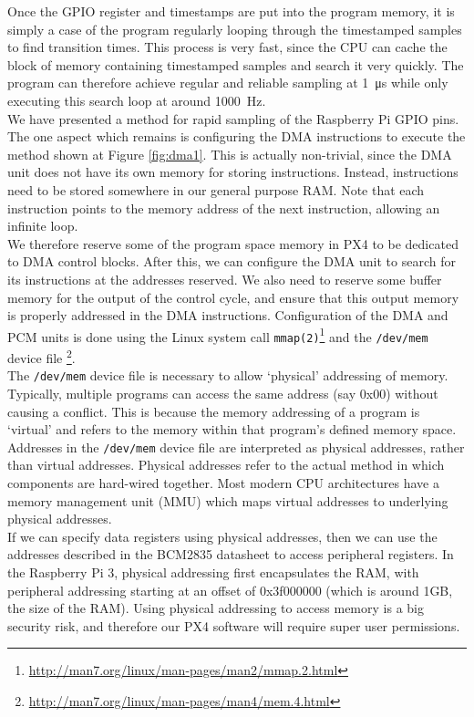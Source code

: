 \documentclass[capstone_report.tex]{subfiles}
\begin{document}
    Once the GPIO register and timestamps are put into the program memory, it is simply a case of the program regularly looping through the timestamped samples to find transition times. This process is very fast, since the CPU can cache the block of memory containing timestamped samples and search it very quickly. The program can therefore achieve regular and reliable sampling at \SI{1}{\micro\second} while only executing this search loop at around \SI{1000}{\hertz}.\\

    We have presented a method for rapid sampling of the Raspberry Pi GPIO pins. The one aspect which remains is configuring the DMA instructions to execute the method shown at Figure \ref{fig:dma1}. This is actually non-trivial, since the DMA unit does not have its own memory for storing instructions. Instead, instructions need to be stored somewhere in our general purpose RAM. Note that each instruction points to the memory address of the next instruction, allowing an infinite loop. \\

    We therefore reserve some of the program space memory in PX4 to be dedicated to DMA control blocks. After this, we can configure the DMA unit to search for its instructions at the addresses reserved. We also need to reserve some buffer memory for the output of the control cycle, and ensure that this output memory is properly addressed in the DMA instructions. Configuration of the DMA and PCM units is done using the Linux system call \texttt{mmap(2)}\footnote{\url{http://man7.org/linux/man-pages/man2/mmap.2.html}} and the \texttt{/dev/mem} device file \footnote{\url{http://man7.org/linux/man-pages/man4/mem.4.html}}. \\

    The \texttt{/dev/mem} device file is necessary to allow `physical' addressing of memory. Typically, multiple programs can access the same address (say 0x00) without causing a conflict. This is because the memory addressing of a program is `virtual' and refers to the memory within that program's defined memory space. Addresses in the \texttt{/dev/mem} device file are interpreted as physical addresses, rather than virtual addresses. Physical addresses refer to the actual method in which components are hard-wired together. Most modern CPU architectures have a memory management unit (MMU) which maps virtual addresses to underlying physical addresses. \\

    If we can specify data registers using physical addresses, then we can use the addresses described in the BCM2835 datasheet to access peripheral registers. In the Raspberry Pi 3, physical addressing first encapsulates the RAM, with peripheral addressing starting at an offset of 0x3f000000 (which is around 1GB, the size of the RAM). Using physical addressing to access memory is a big security risk, and therefore our PX4 software will require super user permissions. \\
\end{document}
